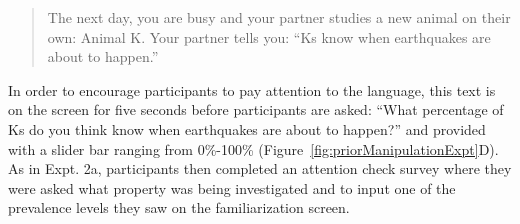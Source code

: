 \documentclass[floatsintext,doc]{apa6}
\begin{document}
\begin{quote}
The next day, you are busy and your partner studies a new animal on their own: Animal K.
Your partner tells you: \enquote{Ks know when earthquakes are about to happen.}
\end{quote}

In order to encourage participants to pay attention to the language, this text is on the screen for five seconds before participants are asked: \enquote{What percentage of Ks do you think know when earthquakes are about to happen?} and provided with a slider bar ranging from 0\%-100\% (Figure~\ref{fig:priorManipulationExpt}D).
As in Expt. 2a, participants then completed an attention check survey where they were asked what property was being investigated and to input one of the prevalence levels they saw on the familiarization screen.

\end{document}
